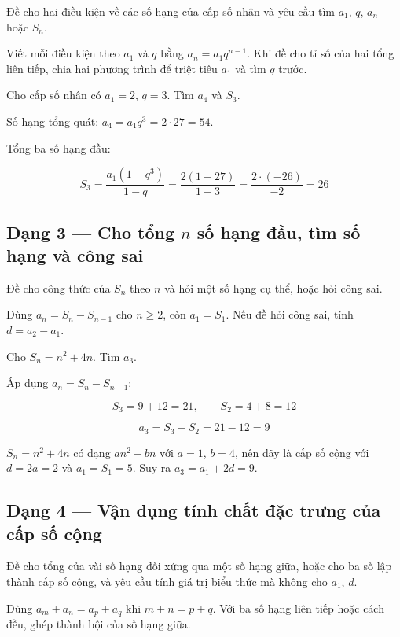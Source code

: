 \documentclass[11pt, a4paper]{article}
\begin{document}
 Đề cho hai điều kiện về các số hạng của cấp số nhân và yêu cầu tìm $a_1$, $q$, $a_n$ hoặc $S_n$.

 Viết mỗi điều kiện theo $a_1$ và $q$ bằng $a_n = a_1 q^{n-1}$. Khi đề cho tỉ số của hai tổng liên tiếp, chia hai phương trình để triệt tiêu $a_1$ và tìm $q$ trước.

\begin{vidu}[{2}]
Cho cấp số nhân có $a_1 = 2$, $q = 3$. Tìm $a_4$ và $S_3$.

Số hạng tổng quát: $a_4 = a_1 q^3 = 2 \cdot 27 = 54$.

Tổng ba số hạng đầu:

$$S_3 = \frac{a_1(1 - q^3)}{1 - q} = \frac{2(1 - 27)}{1 - 3} = \frac{2 \cdot (-26)}{-2} = 26$$

\end{vidu}
\subsection{Dạng 3 — Cho tổng $n$ số hạng đầu, tìm số hạng và công sai}

 Đề cho công thức của $S_n$ theo $n$ và hỏi một số hạng cụ thể, hoặc hỏi công sai.

 Dùng $a_n = S_n - S_{n-1}$ cho $n \ge 2$, còn $a_1 = S_1$. Nếu đề hỏi công sai, tính $d = a_2 - a_1$.

\begin{vidu}[{3}]
Cho $S_n = n^2 + 4n$. Tìm $a_3$.

Áp dụng $a_n = S_n - S_{n-1}$:

$$S_3 = 9 + 12 = 21, \qquad S_2 = 4 + 8 = 12$$

$$a_3 = S_3 - S_2 = 21 - 12 = 9$$

 $S_n = n^2 + 4n$ có dạng $an^2 + bn$ với $a = 1$, $b = 4$, nên dãy là cấp số cộng với $d = 2a = 2$ và $a_1 = S_1 = 5$. Suy ra $a_3 = a_1 + 2d = 9$.

\end{vidu}
\subsection{Dạng 4 — Vận dụng tính chất đặc trưng của cấp số cộng}

 Đề cho tổng của vài số hạng đối xứng qua một số hạng giữa, hoặc cho ba số lập thành cấp số cộng, và yêu cầu tính giá trị biểu thức mà không cho $a_1$, $d$.

 Dùng $a_m + a_n = a_p + a_q$ khi $m + n = p + q$. Với ba số hạng liên tiếp hoặc cách đều, ghép thành bội của số hạng giữa.
\end{document}
